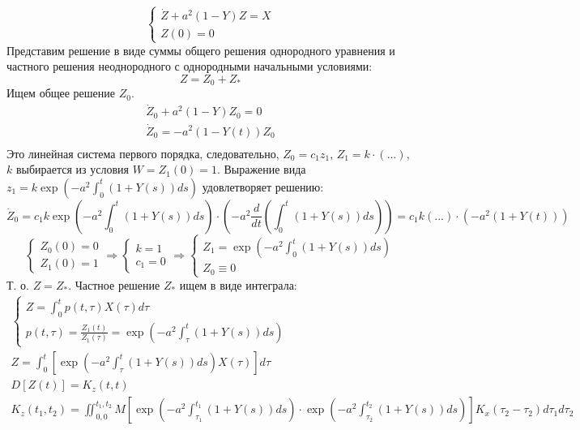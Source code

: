 \documentclass[a4paper,12pt]{article}
\begin{document}
\[\begin{cases}
    \dot Z + a^2(1-Y) Z = X \\
    Z(0)=0
\end{cases}\]
Представим решение в виде суммы общего решения однородного уравнения и частного решения неоднородного с однородными начальными условиями:
 \[Z=Z_0 + Z_*\]
Ищем общее решение $Z_0$.
\begin{gather*}
    \dot Z_0 + a^2(1-Y)Z_0 = 0 \\
    \dot Z_0 = -a^2(1-Y(t))Z_0 \\
\end{gather*}
Это линейная система первого порядка, следовательно, $ Z_0 = c_1 z_1 $, $ Z_1 = k \cdot (...) $, $k$ выбирается из условия $ W = Z_1(0) = 1 $.
Выражение вида $ z_1 = k \exp\left(- a^2 \int_{0}^{t} (1+Y(s)) ds \right) $ удовлетворяет решению:
\[ \dot Z_0 = c_1 k \exp \left(- a^2 \int_{0}^{t} (1+Y(s)) ds \right) \cdot \left(- a^2 \frac{d}{dt} \left( \int_{0}^{t} (1+Y(s)) ds \right) \right) = c_1 k (...) \cdot (- a^2(1+Y(t))) \]
\[ \begin{cases}
    Z_0(0)=0 \\
    Z_1(0)=1
\end{cases} \Rightarrow
\begin{cases}
    k = 1 \\
    c_1 = 0
\end{cases} \Rightarrow
\begin{cases}
    Z_1 = \exp \left( - a^2 \int_{0}^{t} (1+Y(s)) ds \right) \\
    Z_0 \equiv 0
\end{cases} \]
Т. о. $ Z = Z_* $.
Частное решение $Z_*$ ищем в виде интеграла:
\begin{gather*}
    \begin{cases}
        Z = \int_{0}^{t} p(t, \tau) X(\tau) d \tau \\
        p(t,\tau) = \frac{Z_1(t)}{Z_1(\tau)} = \exp \left( - a^2 \int_{\tau}^{t} (1+Y(s)) ds \right)
    \end{cases} \\
    \boxed{ Z = \int_{0}^{t} \left[ \exp \left( - a^2 \int_{\tau}^{t} (1+Y(s)) ds \right) X(\tau) \right] d \tau } \\
    D[Z(t)] = K_z(t,t) \\
    K_z(t_1,t_2) = \iint_{0,0}^{t_1,t_2} M\left[
        \exp \left(- a^2 \int_{\tau_1}^{t_1} (1+Y(s)) ds \right) \cdot
        \exp \left(- a^2 \int_{\tau_2}^{t_2} (1+Y(s)) ds \right)\right] K_x(\tau_2-\tau_2) d\tau_1 d\tau_2 \\
\end{gather*}
\end{document}
